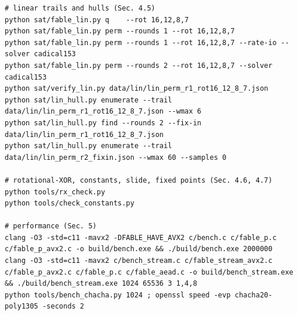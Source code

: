 \documentclass{iacrtrans}
\begin{document}
\begin{lstlisting}[basicstyle=\ttfamily\footnotesize,breaklines=true]
# linear trails and hulls (Sec. 4.5)
python sat/fable_lin.py q    --rot 16,12,8,7
python sat/fable_lin.py perm --rounds 1 --rot 16,12,8,7
python sat/fable_lin.py perm --rounds 1 --rot 16,12,8,7 --rate-io --solver cadical153
python sat/fable_lin.py perm --rounds 2 --rot 16,12,8,7 --solver cadical153
python sat/verify_lin.py data/lin/lin_perm_r1_rot16_12_8_7.json
python sat/lin_hull.py enumerate --trail data/lin/lin_perm_r1_rot16_12_8_7.json --wmax 6
python sat/lin_hull.py find --rounds 2 --fix-in data/lin/lin_perm_r1_rot16_12_8_7.json
python sat/lin_hull.py enumerate --trail data/lin/lin_perm_r2_fixin.json --wmax 60 --samples 0

# rotational-XOR, constants, slide, fixed points (Sec. 4.6, 4.7)
python tools/rx_check.py
python tools/check_constants.py

# performance (Sec. 5)
clang -O3 -std=c11 -mavx2 -DFABLE_HAVE_AVX2 c/bench.c c/fable_p.c c/fable_p_avx2.c -o build/bench.exe && ./build/bench.exe 2000000
clang -O3 -std=c11 -mavx2 c/bench_stream.c c/fable_stream_avx2.c c/fable_p_avx2.c c/fable_p.c c/fable_aead.c -o build/bench_stream.exe && ./build/bench_stream.exe 1024 65536 3 1,4,8
python tools/bench_chacha.py 1024 ; openssl speed -evp chacha20-poly1305 -seconds 2
\end{lstlisting}
\end{document}
